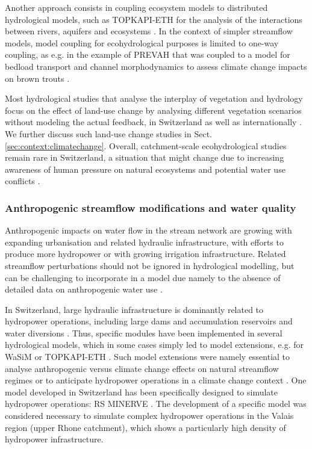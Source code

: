 \documentclass[10pt,a4paper]{article}
\begin{document}
Another approach consists in coupling ecosystem models to distributed hydrological models, such as TOPKAPI-ETH for the analysis of the interactions between rivers, aquifers and ecosystems \citep{Foglia2009, Pappas2015}. In the context of simpler streamflow models, model coupling for ecohydrological purposes is limited to one-way coupling, as e.g. in the example of PREVAH that was coupled to a model for bedload transport and channel morphodynamics to assess climate change impacts on brown trouts \citep{Junker2015}. 

Most hydrological studies that analyse the interplay of vegetation and hydrology focus on the effect of land-use change by analysing different vegetation scenarios without modeling the actual feedback, in Switzerland as well as internationally \citep{Dwarakish2015}. We further discuss such land-use change studies in Sect. \ref{sec:context:climatechange}. Overall, catchment-scale ecohydrological studies remain rare in Switzerland, a situation that might change due to increasing awareness of human pressure on natural ecosystems and potential water use conflicts \citep{Milano2016}.


\subsubsection{Anthropogenic streamflow modifications and water quality}
\label{sec:context:infrastructures}

Anthropogenic impacts on water flow in the stream network are growing with expanding urbanisation and related hydraulic infrastructure, with efforts to produce more hydropower \citep{Schaefli2018} or with growing irrigation infrastructure. Related streamflow perturbations should not be ignored in hydrological modelling, but can be challenging to incorporate in a model due namely to the absence of detailed data on anthropogenic water use \citep{FOEN2021}.

In Switzerland, large hydraulic infrastructure is dominantly related to hydropower operations, including large dams and accumulation reservoirs and water diversions \citep{Schaefli2018}. Thus, specific modules have been implemented in several hydrological models, which in some cases simply led to model extensions, e.g. for WaSiM \citep{Verbunt2005} or TOPKAPI-ETH \citep{Fatichi2014}. Such model extensions were namely essential to analyse anthropogenic versus climate change effects on natural streamflow regimes \citep{Fatichi2014} or to anticipate hydropower operations in a climate change context \citep{Fatichi2015b, Anghileri2018}. One model developed in Switzerland has been specifically designed to simulate hydropower operations: RS MINERVE \citep{GarciaHernandez2020, Foehn2020}. The development of a specific model was considered necessary to simulate complex hydropower operations in the Valais region (upper Rhone catchment), which shows a particularly high density of hydropower infrastructure.
\end{document}
